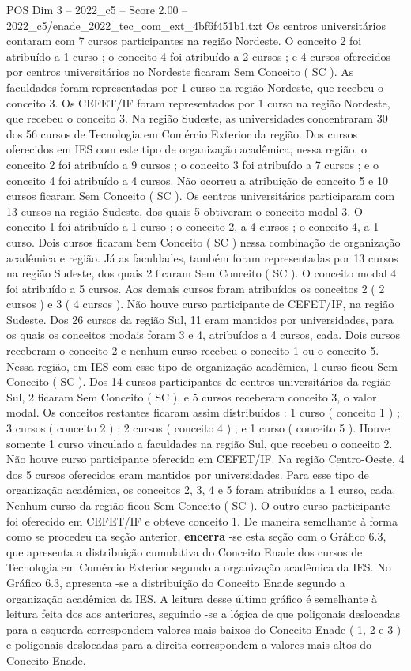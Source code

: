 \begin{textsample}{POS Dim 3 – 2022\_c5 – Score 2.00 – 2022\_c5/enade\_2022\_tec\_com\_ext\_4bf6f451b1.txt}
Os centros universitários contaram com 7 cursos participantes na região Nordeste.
O conceito 2 foi atribuído a 1 curso ; o conceito 4 foi atribuído a 2 cursos ; e 4 cursos oferecidos por centros universitários no Nordeste ficaram Sem Conceito ( SC ).
As faculdades foram representadas por 1 curso na região Nordeste, que recebeu o conceito 3.
Os CEFET/IF foram representados por 1 curso na região Nordeste, que recebeu o conceito 3.
Na região Sudeste, as universidades concentraram 30 dos 56 cursos de Tecnologia em Comércio Exterior da região.
Dos cursos oferecidos em IES com este tipo de organização acadêmica, nessa região, o conceito 2 foi atribuído a 9 cursos ; o conceito 3 foi atribuído a 7 cursos ; e o conceito 4 foi atribuído a 4 cursos.
Não ocorreu a atribuição de conceito 5 e 10 cursos ficaram Sem Conceito ( SC ).
Os centros universitários participaram com 13 cursos na região Sudeste, dos quais 5 obtiveram o conceito modal 3.
O conceito 1 foi atribuído a 1 curso ; o conceito 2, a 4 cursos ; o conceito 4, a 1 curso.
Dois cursos ficaram Sem Conceito ( SC ) nessa combinação de organização acadêmica e região.
Já as faculdades, também foram representadas por 13 cursos na região Sudeste, dos quais 2 ficaram Sem Conceito ( SC ).
O conceito modal 4 foi atribuído a 5 cursos.
Aos demais cursos foram atribuídos os conceitos 2 ( 2 cursos ) e 3 ( 4 cursos ).
Não houve curso participante de CEFET/IF, na região Sudeste.
Dos 26 cursos da região Sul, 11 eram mantidos por universidades, para os quais os conceitos modais foram 3 e 4, atribuídos a 4 cursos, cada.
Dois cursos receberam o conceito 2 e nenhum curso recebeu o conceito 1 ou o conceito 5.
Nessa região, em IES com esse tipo de organização acadêmica, 1 curso ficou Sem Conceito ( SC ).
Dos 14 cursos participantes de centros universitários da região Sul, 2 ficaram Sem Conceito ( SC ), e 5 cursos receberam conceito 3, o valor modal.
Os conceitos restantes ficaram assim distribuídos : 1 curso ( conceito 1 ) ; 3 cursos ( conceito 2 ) ; 2 cursos ( conceito 4 ) ; e 1 curso ( conceito 5 ).
Houve somente 1 curso vinculado a faculdades na região Sul, que recebeu o conceito 2.
Não houve curso participante oferecido em CEFET/IF.
Na região Centro-Oeste, 4 dos 5 cursos oferecidos eram mantidos por universidades.
Para esse tipo de organização acadêmica, os conceitos 2, 3, 4 e 5 foram atribuídos a 1 curso, cada.
Nenhum curso da região ficou Sem Conceito ( SC ).
O outro curso participante foi oferecido em CEFET/IF e obteve conceito 1.
De maneira semelhante à forma como se procedeu na seção anterior, \textbf{encerra} -se esta seção com o Gráfico 6.3, que apresenta a distribuição cumulativa do Conceito Enade dos cursos de Tecnologia em Comércio Exterior segundo a organização acadêmica da IES.
No Gráfico 6.3, apresenta -se a distribuição do Conceito Enade segundo a organização acadêmica da IES.
A leitura desse último gráfico é semelhante à leitura feita dos aos anteriores, seguindo -se a lógica de que poligonais deslocadas para a esquerda correspondem valores mais baixos do Conceito Enade ( 1, 2 e 3 ) e poligonais deslocadas para a direita correspondem a valores mais altos do Conceito Enade.

\end{textsample}
